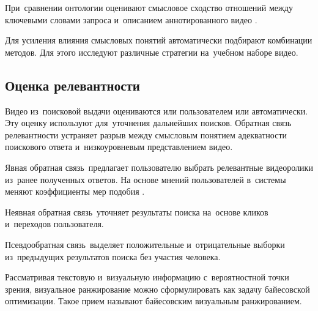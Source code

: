 При~сравнении онтологии оценивают смысловое сходство
отношений между ключевыми словами запроса
и~описанием аннотированного видео \cite{Aytar:2008}.

Для усиления влияния смысловых понятий
автоматически подбирают комбинации методов.
Для этого исследуют различные стратегии на~учебном наборе видео.

\subsection{Оценка релевантности}

Видео из~поисковой выдачи оцениваются или пользователем или автоматически.
Эту оценку используют для~уточнения дальнейших поисков.
Обратная связь релевантности устраняет разрыв между смысловым понятием
адекватности поискового ответа и~низкоуровневым представлением видео.

Явная обратная связь\ предлагает пользователю выбрать
релевантные видеоролики из~ранее полученных ответов.
На основе мнений пользователей в~системы меняют коэффициенты
мер подобия \cite{Chen:2008:a}.

Неявная обратная связь\ уточняет результаты поиска
на~основе кликов и~переходов пользователя.

Псевдообратная связь\
выделяет положительные и~отрицательные выборки
из~предыдущих результатов поиска без участия человека.

Рассматривая текстовую и~визуальную информацию
с~вероятностной точки зрения, визуальное ранжирование
можно сформулировать как задачу байесовской оптимизации.
Такое прием называют байесовским визуальным ранжированием.


